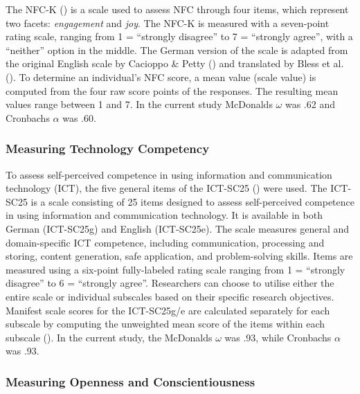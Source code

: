 \documentclass[
  12pt,
  a4paper,
  twoside]{article}
\begin{document}
The NFC-K () is a scale used to assess NFC through four items, which represent two facets: \emph{engagement} and \emph{joy}.
The NFC-K is measured with a seven-point rating scale, ranging from 1 = ``strongly disagree'' to 7 = ``strongly agree'', with a ``neither'' option in the middle.
The German version of the scale is adapted from the original English scale by Cacioppo \& Petty () and translated by Bless et al. (). To determine an individual's NFC score, a mean value (scale value) is computed from the four raw score points of the responses.
The resulting mean values range between 1 and 7.
In the current study McDonalds \(\omega\) was .62 and Cronbachs \(\alpha\) was .60.

\subsubsection{Measuring Technology Competency}\label{measuring-technology-competency}

To assess self-perceived competence in using information and communication technology (ICT), the five general items of the ICT-SC25 () were used.
The ICT-SC25 is a scale consisting of 25 items designed to assess self-perceived competence in using information and communication
technology.
It is available in both German (ICT-SC25g) and English (ICT-SC25e).
The scale measures general and domain-specific ICT competence, including communication, processing and storing, content generation, safe application, and problem-solving skills.
Items are measured using a six-point fully-labeled rating scale ranging from 1 = ``strongly disagree'' to 6 = ``strongly agree''.
Researchers can choose to utilise either the entire scale or individual subscales based on their specific research objectives.
Manifest scale scores for the ICT-SC25g/e are calculated separately for each subscale by computing the unweighted mean score of the items within each subscale ().
In the current study, the McDonalds \(\omega\) was .93, while Cronbachs \(\alpha\) was .93.

\subsubsection{Measuring Openness and Conscientiousness}\label{measuring-openness-and-conscientiousness}
\end{document}
